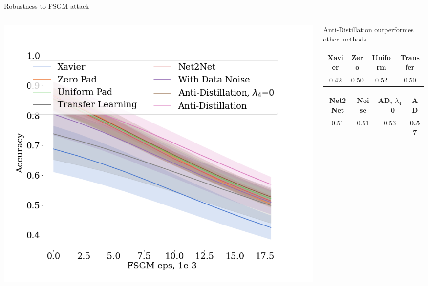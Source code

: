 \documentclass[dvipsnames,aspectratio=169]{beamer}
\begin{document}


\begin{frame}{Robustness to FSGM-attack}

     \begin{columns}
        \begin{column}{0.5\textwidth}
            \includegraphics[width=1.2\textwidth]{figures/fsgm.png}    
        \end{column}

        \begin{column}{0.5\textwidth}
        
            \begin{center}
            Anti-Distillation outperformes other methods.
            \bigskip

            \begin{tabular}{|c|c|c|c|}
                \hline
                 Xavier & Zero & Uniform & Transfer\\
                 \hline 0.42 & 0.50 & 0.52 & 0.50 \\
                 \hline
            \end{tabular}

            \bigskip 

            \begin{tabular}{|c|c|c|c|}
                \hline Net2Net & Noise & AD, $\lambda_4$=0 & AD\\
             \hline 0.51 & 0.51 & 0.53 & \textbf{0.57} \\ 
             \hline
            \end{tabular}
            \end{center}
        \end{column}
    \end{columns}

\end{frame}
\end{document}
